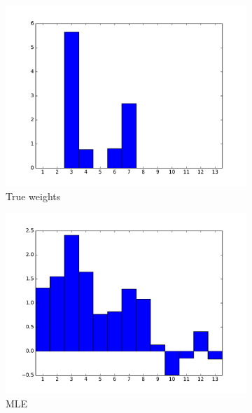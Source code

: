 \documentclass[10pt,psamsfonts]{amsart}
\theoremstyle{definition}
\theoremstyle{remark}
\numberwithin{equation}{section}
\begin{document}
\begin{figure}
	\centering
	\begin{subfigure}[b]{0.24\textwidth}
		\includegraphics[width=\textwidth]{hw1_4-2_1.pdf}
		\caption{True weights}
	\end{subfigure}
	\begin{subfigure}[b]{0.24\textwidth}
		\includegraphics[width=\textwidth]{hw1_4-2_2.pdf}
		\caption{MLE}
	\end{subfigure}
	\begin{subfigure}[b]{0.24\textwidth}

\end{subfigure}
\end{figure}
\end{document}
